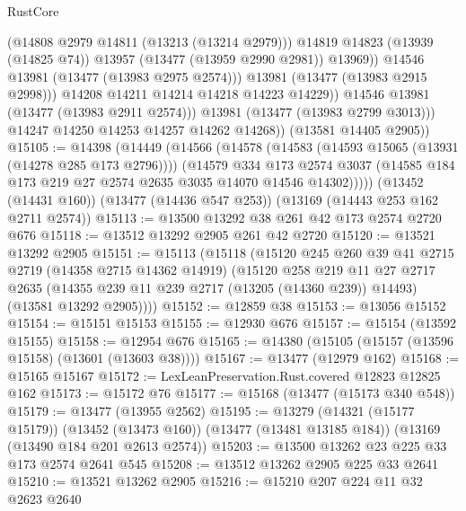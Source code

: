 \begin{lexlean}{RustCore}
\begin{coremodule}
                          (@14808 @2979 @14811 (@13213 (@13214 @2979)))
                          @14819
                          @14823
                          (@13939 (@14825 @74))
                          @13957
                          (@13477 (@13959 @2990 @2981))
                          @13969))
                      @14546
                      @13981
                      (@13477 (@13983 @2975 @2574)))
                    @13981
                    (@13477 (@13983 @2915 @2998)))
                  @14208
                  @14211
                  @14214
                  @14218
                  @14223
                  @14229))
              @14546
              @13981
              (@13477 (@13983 @2911 @2574)))
            @13981
            (@13477 (@13983 @2799 @3013)))
          @14247
          @14250
          @14253
          @14257
          @14262
          @14268))
      (@13581 @14405 @2905))
@15105 := @14398
    (@14449
      (@14566
        (@14578
          (@14583 (@14593 @15065 (@13931 (@14278 @285 @173 @2796))))
          (@14579
            @334
            @173
            @2574
            @3037
            (@14585 @184 @173 @219 @27 @2574 @2635 @3035 @14070 @14546 @14302)))))
    (@13452 (@14431 @160))
    (@13477 (@14436 @547 @253))
    (@13169 (@14443 @253 @162 @2711 @2574))
@15113 := @13500 @13292 @38 @261 @42 @173 @2574 @2720 @676
@15118 := @13512 @13292 @2905 @261 @42 @2720
@15120 := @13521 @13292 @2905
@15151 := @15113
    (@15118
      (@15120
        @245
        @260
        @39
        @41
        @2715
        @2719
        (@14358 @2715 @14362 @14919)
        (@15120
          @258
          @219
          @11
          @27
          @2717
          @2635
          (@14355 @239 @11 @239 @2717 (@13205 (@14360 @239)) @14493)
          (@13581 @13292 @2905))))
@15152 := @12859 @38
@15153 := @13056 @15152
@15154 := @15151 @15153
@15155 := @12930 @676
@15157 := @15154 (@13592 @15155)
@15158 := @12954 @676
@15165 := @14380 (@15105 (@15157 (@13596 @15158) (@13601 (@13603 @38))))
@15167 := @13477 (@12979 @162)
@15168 := @15165 @15167
@15172 := LexLeanPreservation.Rust.covered @12823 @12825 @162
@15173 := @15172 @76
@15177 := @15168 (@13477 (@15173 @340 @548))
@15179 := @13477 (@13955 @2562)
@15195 := @13279
    (@14321 (@15177 @15179))
    (@13452 (@13473 @160))
    (@13477 (@13481 @13185 @184))
    (@13169 (@13490 @184 @201 @2613 @2574))
@15203 := @13500 @13262 @23 @225 @33 @173 @2574 @2641 @545
@15208 := @13512 @13262 @2905 @225 @33 @2641
@15210 := @13521 @13262 @2905
@15216 := @15210 @207 @224 @11 @32 @2623 @2640

\end{coremodule}
\end{lexlean}
